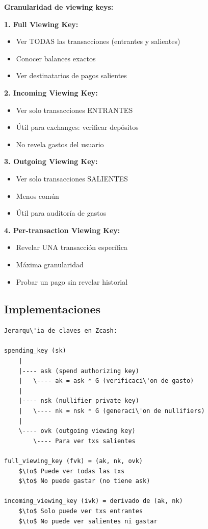 \documentclass[11pt,a4paper,twoside]{book}
\begin{document}
\begin{mathnote}
\textbf{Granularidad de viewing keys:}

\textbf{1. Full Viewing Key:}
\begin{itemize}
    \item Ver TODAS las transacciones (entrantes y salientes)
    \item Conocer balances exactos
    \item Ver destinatarios de pagos salientes
\end{itemize}

\textbf{2. Incoming Viewing Key:}
\begin{itemize}
    \item Ver solo transacciones ENTRANTES
    \item \'Util para exchanges: verificar dep\'ositos
    \item No revela gastos del usuario
\end{itemize}

\textbf{3. Outgoing Viewing Key:}
\begin{itemize}
    \item Ver solo transacciones SALIENTES
    \item Menos com\'un
    \item \'Util para auditor\'ia de gastos
\end{itemize}

\textbf{4. Per-transaction Viewing Key:}
\begin{itemize}
    \item Revelar UNA transacci\'on espec\'ifica
    \item M\'axima granularidad
    \item Probar un pago sin revelar historial
\end{itemize}
\end{mathnote}

\subsection{Implementaciones}

\begin{example}
\begin{verbatim}
Jerarqu\'ia de claves en Zcash:

spending_key (sk)
    |
    |---- ask (spend authorizing key)
    |   \---- ak = ask * G (verificaci\'on de gasto)
    |
    |---- nsk (nullifier private key)
    |   \---- nk = nsk * G (generaci\'on de nullifiers)
    |
    \---- ovk (outgoing viewing key)
        \---- Para ver txs salientes

full_viewing_key (fvk) = (ak, nk, ovk)
    $\to$ Puede ver todas las txs
    $\to$ No puede gastar (no tiene ask)

incoming_viewing_key (ivk) = derivado de (ak, nk)
    $\to$ Solo puede ver txs entrantes
    $\to$ No puede ver salientes ni gastar
\end{verbatim}
\end{example}
\end{document}
